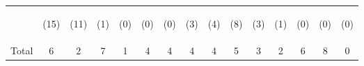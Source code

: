 \begin{tabular}{lcccccccccccccc}
 & \begin{footnotesize}(15)\end{footnotesize} & \begin{footnotesize}(11)\end{footnotesize} & \begin{footnotesize}(1)\end{footnotesize} & \begin{footnotesize}(0)\end{footnotesize} & \begin{footnotesize}(0)\end{footnotesize} & \begin{footnotesize}(0)\end{footnotesize} & \begin{footnotesize}(3)\end{footnotesize} & \begin{footnotesize}(4)\end{footnotesize} & \begin{footnotesize}(8)\end{footnotesize} & \begin{footnotesize}(3)\end{footnotesize} & \begin{footnotesize}(1)\end{footnotesize} & \begin{footnotesize}(0)\end{footnotesize} & \begin{footnotesize}(0)\end{footnotesize} & \begin{footnotesize}(0)\end{footnotesize}\\
\noalign{\smallskip}Total & 6 & 2 & 7 & 1 & 4 & 4 & 4 & 4 & 5 & 3 & 2 & 6 & 8 & 0\\

\end{tabular}
